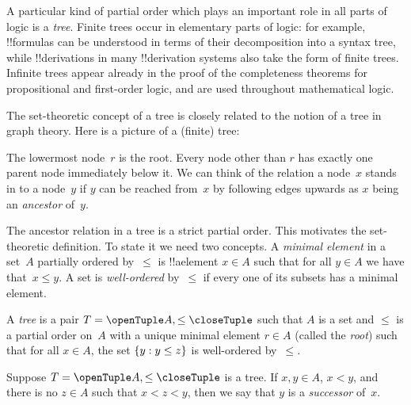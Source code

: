 \documentclass[../../../include/open-logic-section]{subfiles}
\begin{document}

A particular kind of partial order which plays an important role in
all parts of logic is a \emph{tree}. Finite trees occur in elementary
parts of logic: for example, !!{formula}s can be understood in terms
of their decomposition into a syntax tree, while !!{derivation}s in
many !!{derivation} systems also take the form of finite trees.
%
Infinite trees appear already in the proof of the completeness
theorems for propositional and first-order logic, and are used
throughout mathematical logic.

The set-theoretic concept of a tree is closely related to the notion
of a tree in graph theory. Here is a picture of a (finite) tree:

\begin{center}
\end{center}

The lowermost node~$r$ is the root. Every node other than $r$ has
exactly one parent node immediately below it. We can think of the relation
a node~$x$ stands in to a node~$y$ if $y$ can be reached from~$x$ by
following edges upwards as $x$ being an \emph{ancestor} of~$y$. 

The ancestor relation in a tree is a strict partial order. This
motivates the set-theoretic definition. To state it we need two
concepts. A \emph{minimal element} in a set~$A$ partially ordered
by~$\le$ is !!a{element} $x \in A$ such that for all $y \in A$ we have
that~$x \le y$. A set is \emph{well-ordered} by~$\le$ if every one of
its subsets has a minimal element.

\begin{defn}[Tree]
A \emph{tree} is a pair $T = \tuple{A, \le}$ such that $A$ is a set
and $\le$ is a partial order on~$A$ with a unique minimal element
$r \in A$ (called the \emph{root}) such that for all $x \in A$,
the set $\{ y : y \le z \}$ is well-ordered by~$\le$.
\end{defn}

\begin{defn}[Successors]
Suppose $T = \tuple{A, \le}$ is a tree.
If $x,y \in A$, $x < y$, and there is no $z \in A$ such that
$x < z < y$, then we say that $y$ is a \emph{successor} of~$x$.
\end{defn}
\end{document}
